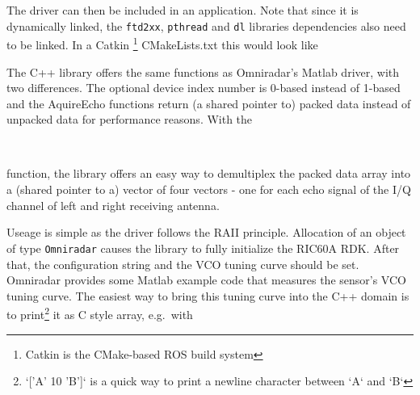 \begin{Shaded}
\begin{Highlighting}[]
\KeywordTok{\&\&} 
\end{Highlighting}
\end{Shaded}

The driver can then be included in an application. Note that since it is
dynamically linked, the \texttt{ftd2xx}, \texttt{pthread} and
\texttt{dl} libraries dependencies also need to be linked. In a Catkin
\footnote{Catkin is the CMake-based ROS build system} CMakeLists.txt
this would look like

\begin{Shaded}
\begin{Highlighting}[]
\NormalTok{(}
\NormalTok{)}
\end{Highlighting}
\end{Shaded}

The C++ library offers the same functions as Omniradar's Matlab driver,
with two differences. The optional device index number is 0-based
instead of 1-based and the AquireEcho functions return (a shared pointer
to) packed data instead of unpacked data for performance reasons. With
the

\begin{Shaded}
\begin{Highlighting}[]
 \NormalTok{ > > >}\\
\end{Highlighting}
\end{Shaded}

function, the library offers an easy way to demultiplex the packed data
array into a (shared pointer to a) vector of four vectors - one for each
echo signal of the I/Q channel of left and right receiving antenna.

Useage is simple as the driver follows the RAII principle. Allocation of
an object of type \texttt{Omniradar} causes the library to fully
initialize the RIC60A RDK. After that, the configuration string and the
VCO tuning curve should be set. Omniradar provides some Matlab example
code that measures the sensor's VCO tuning curve. The easiest way to
bring this tuning curve into the C++ domain is to
print\footnote{`['A' 10 'B']` is a quick way to print a newline character between `A` and `B`}
it as C style array, e.g.~with

